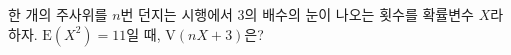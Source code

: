 한 개의 주사위를 $n$번 던지는 시행에서 3의 배수의 눈이 나오는 횟수를 확률변수 $X$라 하자. $\mathrm{E}(X^2)=11$일 때, $\mathrm{V}(nX+3)$은?
